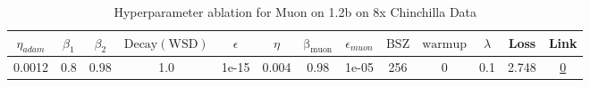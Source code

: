 \begin{table}[H]
\centering
\caption{Hyperparameter ablation for Muon on 1.2b on 8x Chinchilla Data}
\label{tab:ablation_muon_1.2b_8}
\begin{tabular}{ccccccccccccc}
\toprule
$\eta_{adam}$ & $\beta_1$ & $\beta_2$ & $\mathrm{Decay (WSD)}$ & $\epsilon$ & $\eta$ & $\mathrm{\beta_{muon}}$ & $\epsilon_{muon}$ & $\mathrm{BSZ}$ & $\mathrm{warmup}$ & $\lambda$ & Loss & Link \\
\midrule
0.0012 & 0.8 & 0.98 & 1.0 & 1e-15 & 0.004 & 0.98 & 1e-05 & 256 & 0 & 0.1 & 2.748 & \href{https://wandb.ai/stanford-mercury/optimizer-scaling/runs/sweep-1.2b-193B-muon4a7234lr0.004-wd0.1-minlr0.0-warmup0.0-b10.8-2335ab}{0} \\
\midrule
\bottomrule
\end{tabular}
\end{table}

